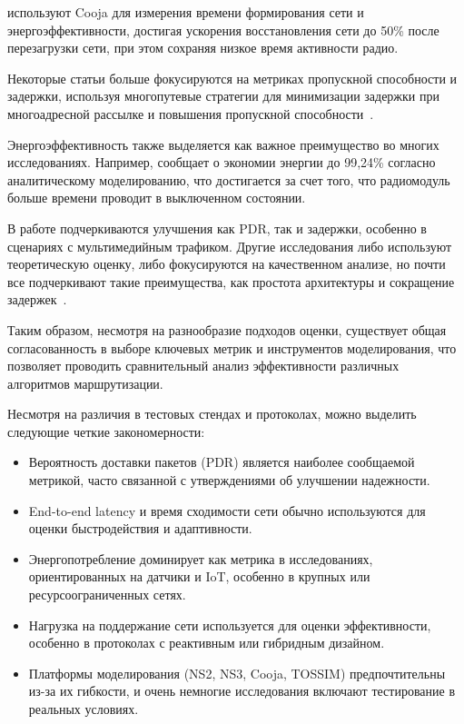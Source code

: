 \documentclass[%
]{report}
\begin{document}
\textcite{HECK2025110364} используют
Cooja для измерения времени формирования сети
и энергоэффективности, достигая ускорения восстановления
сети до 50\% после
перезагрузки сети,
при этом сохраняя низкое время активности радио. 

Некоторые статьи больше фокусируются на метриках
пропускной способности и задержки,
используя многопутевые стратегии для минимизации
задержки при многоадресной рассылке и повышения
пропускной способности~\cite{KUMAR2012481,LI2011458}.

Энергоэффективность также выделяется как важное
преимущество во многих исследованиях. Например,
\textcite{HERNANDEZSOLANA2022109114} сообщает
о экономии энергии до 99,24\% согласно аналитическому
моделированию, что достигается за счет
того, что радиомодуль больше времени проводит в выключенном состоянии.

В работе \textcite{PAN2012952} подчеркиваются
улучшения как PDR, так и задержки,
особенно в сценариях с мультимедийным трафиком.
Другие исследования либо используют теоретическую оценку,
либо фокусируются на качественном анализе,
но почти все подчеркивают такие преимущества,
как простота архитектуры и сокращение задержек~\cite{ALVAREZ2008240,DIIANNI1998131}.

Таким образом, несмотря на разнообразие подходов
оценки, существует общая согласованность
в выборе ключевых метрик и инструментов
моделирования, что позволяет проводить
сравнительный анализ эффективности различных алгоритмов
маршрутизации.

Несмотря на различия в тестовых стендах и протоколах, можно выделить следующие четкие закономерности:

\begin{itemize}
\item    Вероятность доставки пакетов (PDR)
является наиболее сообщаемой метрикой,
часто связанной с утверждениями об улучшении надежности.
\item    End-to-end latency
и время сходимости сети обычно
используются для оценки быстродействия и адаптивности.
\item    Энергопотребление доминирует
как метрика в исследованиях,
ориентированных на датчики и IoT,
особенно в крупных или ресурсоограниченных сетях.
\item    Нагрузка на поддержание сети
используется для оценки эффективности, особенно в протоколах
с реактивным или гибридным дизайном.
\item    Платформы моделирования
(NS2, NS3, Cooja, TOSSIM) предпочтительны из-за их
гибкости, и очень немногие исследования включают
тестирование в реальных условиях.
\end{itemize}
\end{document}
